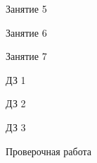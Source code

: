 \begin{class}[number=5]
	\begin{listofex}
		\item Занятие 5
	\end{listofex}
\end{class}

\begin{class}[number=6]
	\begin{listofex}
		\item Занятие 6
	\end{listofex}
\end{class}

\begin{class}[number=7]
	\begin{listofex}
		\item Занятие 7
	\end{listofex}
\end{class}

\begin{homework}[number=1]
	\begin{listofex}
		\item ДЗ 1
	\end{listofex}
\end{homework}

\begin{homework}[number=2]
	\begin{listofex}
		\item ДЗ 2
	\end{listofex}
\end{homework}

\begin{homework}[number=3]
	\begin{listofex}
		\item ДЗ 3
	\end{listofex}
\end{homework}

\begin{exam}
	\begin{listofex}
		\item Проверочная работа
	\end{listofex}
\end{exam}
